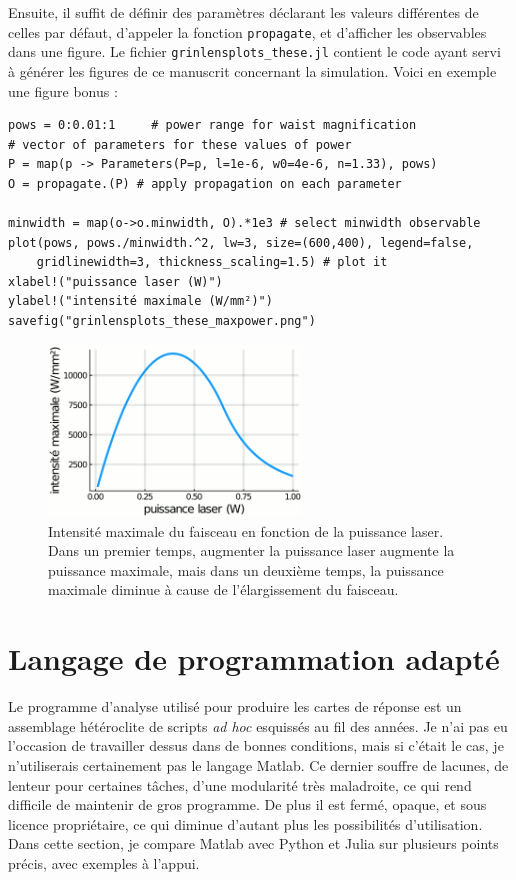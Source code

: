Ensuite, il suffit de définir des paramètres déclarant les valeurs différentes de celles par défaut, d'appeler la fonction \verb|propagate|, et d'afficher les observables dans une figure. Le fichier \verb|grinlensplots_these.jl| contient le code ayant servi à générer les figures de ce manuscrit concernant la simulation. Voici en exemple une figure bonus :

\juliastyle
\begin{lstlisting}
pows = 0:0.01:1     # power range for waist magnification
# vector of parameters for these values of power
P = map(p -> Parameters(P=p, l=1e-6, w0=4e-6, n=1.33), pows)
O = propagate.(P) # apply propagation on each parameter

minwidth = map(o->o.minwidth, O).*1e3 # select minwidth observable
plot(pows, pows./minwidth.^2, lw=3, size=(600,400), legend=false,
    gridlinewidth=3, thickness_scaling=1.5) # plot it
xlabel!("puissance laser (W)")
ylabel!("intensité maximale (W/mm²)")
savefig("grinlensplots_these_maxpower.png")
\end{lstlisting}

\begin{figure}
    \centering
    \includegraphics[width=0.6\textwidth]{./files/grinlensplots_these_maxpower.png}
    \caption{Intensité maximale du faisceau en fonction de la puissance laser. Dans un premier temps, augmenter la puissance laser augmente la puissance maximale, mais dans un deuxième temps, la puissance maximale diminue à cause de l'élargissement du faisceau.
    \label{AppFIGmaxintensity}}
    \end{figure}


\section{Langage de programmation adapté}\label{langageadapte}

Le programme d'analyse utilisé pour produire les cartes de réponse est un assemblage hétéroclite de scripts \emph{ad hoc} esquissés au fil des années. Je n'ai pas eu l'occasion de travailler dessus dans de bonnes conditions, mais si c'était le cas, je n'utiliserais certainement pas le langage Matlab. Ce dernier souffre de lacunes, de lenteur pour certaines tâches, d'une modularité très maladroite, ce qui rend difficile de maintenir de gros programme. De plus il est fermé, opaque, et sous licence propriétaire, ce qui diminue d'autant plus les possibilités d'utilisation. Dans cette section, je compare Matlab avec Python et Julia sur plusieurs points précis, avec exemples à l'appui.

